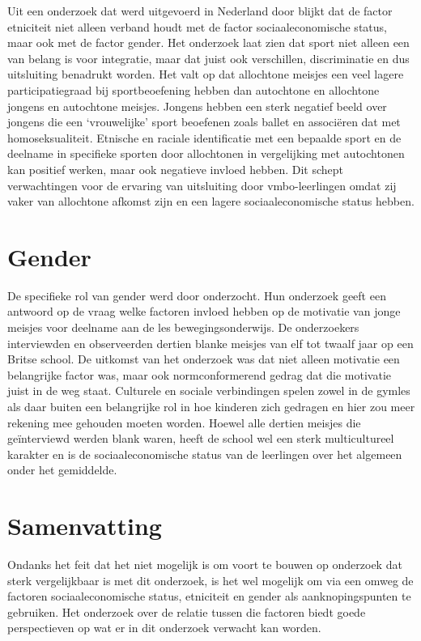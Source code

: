 \documentclass[a4paper,12pt]{memoir}
\begin{document}
Uit een onderzoek dat werd uitgevoerd in Nederland door \textcite{elling} blijkt dat de factor etniciteit niet alleen verband houdt met de factor sociaaleconomische status, maar ook met de factor gender. Het onderzoek laat zien dat sport niet alleen een van belang is voor integratie, maar dat juist ook verschillen, discriminatie en dus uitsluiting benadrukt worden. Het valt op dat allochtone meisjes een veel lagere participatiegraad bij sportbeoefening hebben dan autochtone en allochtone jongens en autochtone meisjes. Jongens hebben een sterk negatief beeld over jongens die een `vrouwelijke' sport beoefenen zoals ballet en associëren dat met homoseksualiteit. Etnische en raciale identificatie met een bepaalde sport en de deelname in specifieke sporten door allochtonen in vergelijking met autochtonen kan positief werken, maar ook negatieve invloed hebben. Dit schept verwachtingen voor de ervaring van uitsluiting door vmbo-leerlingen omdat zij vaker van allochtone afkomst zijn en een lagere sociaaleconomische status hebben.

\section{Gender}

De specifieke rol van gender werd door \textcite{donovan} onderzocht. Hun onderzoek geeft een antwoord op de vraag welke factoren invloed hebben op de motivatie van jonge meisjes voor deelname aan de les bewegingsonderwijs. De onderzoekers interviewden en observeerden dertien blanke meisjes van elf tot twaalf jaar op een Britse school. De uitkomst van het onderzoek was dat niet alleen motivatie een belangrijke factor was, maar ook normconformerend gedrag dat die motivatie juist in de weg staat. Culturele en sociale verbindingen spelen zowel in de gymles als daar buiten een belangrijke rol in hoe kinderen zich gedragen en hier zou meer rekening mee gehouden moeten worden. Hoewel alle dertien meisjes die geïnterviewd werden blank waren, heeft de school wel een sterk multicultureel karakter en is de sociaaleconomische status van de leerlingen over het algemeen onder het gemiddelde.

\section{Samenvatting}

Ondanks het feit dat het niet mogelijk is om voort te bouwen op onderzoek dat sterk vergelijkbaar is met dit onderzoek, is het wel mogelijk om via een omweg de factoren sociaaleconomische status, etniciteit en gender als aanknopingspunten te gebruiken. Het onderzoek over de relatie tussen die factoren biedt goede perspectieven op wat er in dit onderzoek verwacht kan worden.
\end{document}
